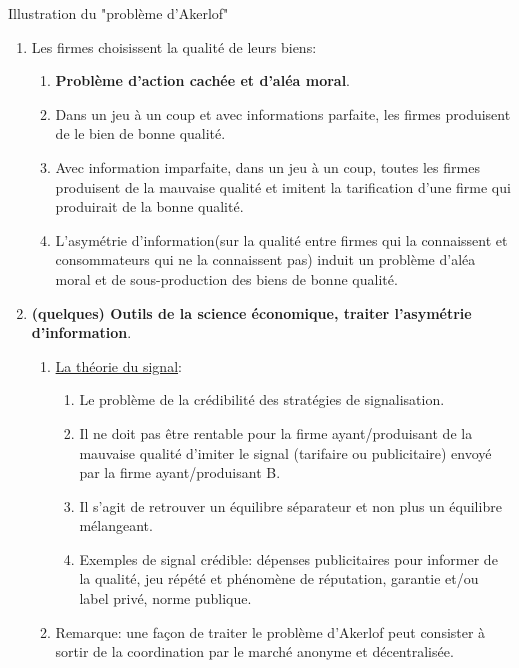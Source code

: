 \begin{frame}[allowframebreaks]{Illustration du "problème d’Akerlof"}
\begin{enumerate}
\item Les firmes choisissent la qualité de leurs biens: 
\begin{enumerate}[$\star$]
    \item  \textbf{Problème d’action cachée et d’aléa moral}.
    \item Dans un jeu à un coup et avec informations parfaite, les firmes produisent de le bien de
     bonne qualité.
     \item Avec information imparfaite, 
     dans un jeu à un coup, toutes les firmes produisent de la 
     mauvaise qualité et imitent la tarification d’une firme qui produirait de la bonne qualité.
     \item L’asymétrie d’information(sur la qualité entre firmes qui la connaissent et consommateurs qui ne la connaissent pas) 
     induit un problème d’aléa moral et de sous-production des biens de bonne qualité.
\end{enumerate}

\framebreak

\item \textbf{(quelques) Outils de la science économique, traiter l’asymétrie d’information}.
\begin{enumerate}[$\star$]
    \item \href{https://fr.wikipedia.org/wiki/Signal\_(\%C3\%A9conomie)}{La théorie du signal}: 
    \begin{enumerate}[$\star$]
        \item Le problème de la crédibilité des stratégies de signalisation.
        \item Il ne doit pas être rentable pour la firme ayant/produisant de la mauvaise qualité d’imiter 
        le signal (tarifaire ou publicitaire) envoyé par la firme ayant/produisant B. 
        \item Il s’agit de retrouver un équilibre séparateur et non plus un équilibre mélangeant.
        \item Exemples de signal crédible:  dépenses publicitaires pour informer de la qualité, 
        jeu répété et phénomène de réputation, garantie et/ou label privé, norme publique.
    \end{enumerate}
    \item Remarque: une façon de traiter le problème d’Akerlof peut consister à sortir 
    de la coordination par le marché anonyme et décentralisée.
\end{enumerate}
    \end{enumerate}
\end{frame}


